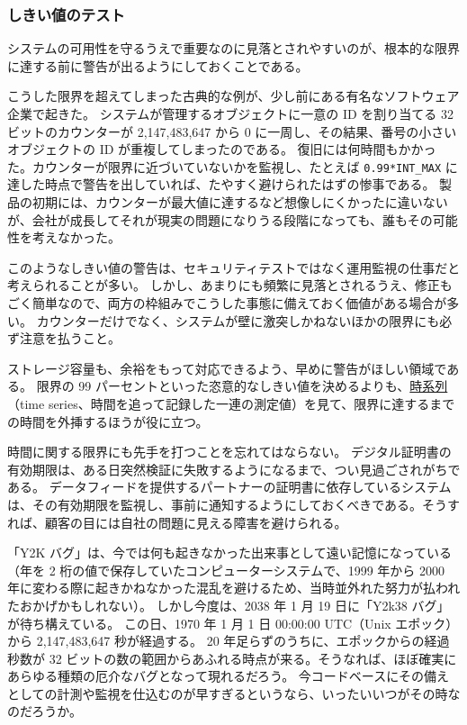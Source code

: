 \documentclass[uplatex]{jsarticle}
\def\label#1{}%
\begin{document}
\subsubsection{しきい値のテスト}

システムの可用性を守るうえで重要なのに見落とされやすいのが、根本的な限界に達する前に警告が出るようにしておくことである。

\begin{exa}[32 ビットカウンターのラップアラウンド]\label{exa:ch12-counter-wrap}
こうした限界を超えてしまった古典的な例が、少し前にある有名なソフトウェア企業で起きた。
システムが管理するオブジェクトに一意の ID を割り当てる 32 ビットのカウンターが 2,147,483,647 から 0 に一周し、その結果、番号の小さいオブジェクトの ID が重複してしまったのである。
復旧には何時間もかかった。カウンターが限界に近づいていないかを監視し、たとえば \texttt{0.99*INT\_MAX} に達した時点で警告を出していれば、たやすく避けられたはずの惨事である。
製品の初期には、カウンターが最大値に達するなど想像しにくかったに違いないが、会社が成長してそれが現実の問題になりうる段階になっても、誰もその可能性を考えなかった。
\end{exa}

このようなしきい値の警告は、セキュリティテストではなく運用監視の仕事だと考えられることが多い。
しかし、あまりにも頻繁に見落とされるうえ、修正もごく簡単なので、両方の枠組みでこうした事態に備えておく価値がある場合が多い。
カウンターだけでなく、システムが壁に激突しかねないほかの限界にも必ず注意を払うこと。

ストレージ容量も、余裕をもって対応できるよう、早めに警告がほしい領域である。
限界の 99 パーセントといった恣意的なしきい値を決めるよりも、\underline{時系列}（time series、時間を追って記録した一連の測定値）を見て、限界に達するまでの時間を外挿するほうが役に立つ。

時間に関する限界にも先手を打つことを忘れてはならない。
デジタル証明書の有効期限は、ある日突然検証に失敗するようになるまで、つい見過ごされがちである。
データフィードを提供するパートナーの証明書に依存しているシステムは、その有効期限を監視し、事前に通知するようにしておくべきである。そうすれば、顧客の目には自社の問題に見える障害を避けられる。

「Y2K バグ」は、今では何も起きなかった出来事として遠い記憶になっている（年を 2 桁の値で保存していたコンピューターシステムで、1999 年から 2000 年に変わる際に起きかねなかった混乱を避けるため、当時並外れた努力が払われたおかげかもしれない）。
しかし今度は、2038 年 1 月 19 日に「Y2k38 バグ」が待ち構えている。
この日、1970 年 1 月 1 日 00:00:00 UTC（Unix エポック）から 2,147,483,647 秒が経過する。
20 年足らずのうちに、エポックからの経過秒数が 32 ビットの数の範囲からあふれる時点が来る。そうなれば、ほぼ確実にあらゆる種類の厄介なバグとなって現れるだろう。
今コードベースにその備えとしての計測や監視を仕込むのが早すぎるというなら、いったいいつがその時なのだろうか。
\end{document}
